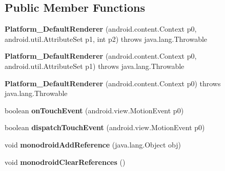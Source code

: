 \subsection*{Public Member Functions}
\begin{DoxyCompactItemize}
\item 
\mbox{\label{classmd5b60ffeb829f638581ab2bb9b1a7f4f3f_1_1Platform__DefaultRenderer_aeafd2a9469465843c186a31ab7c6f1fa}} 
{\bfseries Platform\+\_\+\+Default\+Renderer} (android.\+content.\+Context p0, android.\+util.\+Attribute\+Set p1, int p2)  throws java.\+lang.\+Throwable 	
\item 
\mbox{\label{classmd5b60ffeb829f638581ab2bb9b1a7f4f3f_1_1Platform__DefaultRenderer_abbbf33e1c50423f6b442efed5224ebec}} 
{\bfseries Platform\+\_\+\+Default\+Renderer} (android.\+content.\+Context p0, android.\+util.\+Attribute\+Set p1)  throws java.\+lang.\+Throwable 	
\item 
\mbox{\label{classmd5b60ffeb829f638581ab2bb9b1a7f4f3f_1_1Platform__DefaultRenderer_a3e7015303f57b219dad7b8abd32e2070}} 
{\bfseries Platform\+\_\+\+Default\+Renderer} (android.\+content.\+Context p0)  throws java.\+lang.\+Throwable 	
\item 
\mbox{\label{classmd5b60ffeb829f638581ab2bb9b1a7f4f3f_1_1Platform__DefaultRenderer_a07ccce17539adcbc1b97fbfc02107560}} 
boolean {\bfseries on\+Touch\+Event} (android.\+view.\+Motion\+Event p0)
\item 
\mbox{\label{classmd5b60ffeb829f638581ab2bb9b1a7f4f3f_1_1Platform__DefaultRenderer_ac2385d55d3936317073c71eb3232886e}} 
boolean {\bfseries dispatch\+Touch\+Event} (android.\+view.\+Motion\+Event p0)
\item 
\mbox{\label{classmd5b60ffeb829f638581ab2bb9b1a7f4f3f_1_1Platform__DefaultRenderer_a799e1dac7b8eb2dce35fe56b86695b9d}} 
void {\bfseries monodroid\+Add\+Reference} (java.\+lang.\+Object obj)
\item 
\mbox{\label{classmd5b60ffeb829f638581ab2bb9b1a7f4f3f_1_1Platform__DefaultRenderer_a27a3fcd4a55447ba5df4a3eef8c52982}} 
void {\bfseries monodroid\+Clear\+References} ()
\end{DoxyCompactItemize}
